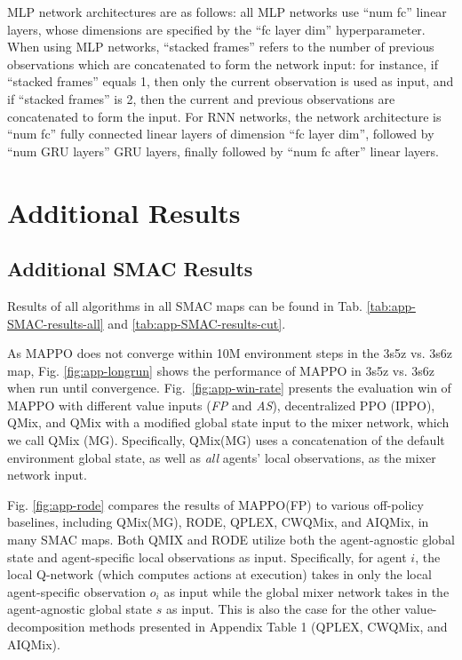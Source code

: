 MLP network architectures are as follows:
all MLP networks use ``num fc'' linear  layers, whose dimensions are specified by the ``fc layer dim'' hyperparameter. When using MLP networks, ``stacked frames'' refers to the number of previous observations which are concatenated to form the network input: for instance, if ``stacked frames'' equals 1, then only the current observation is used as input, and if ``stacked frames'' is 2, then the current and previous observations are concatenated to form the input. For RNN networks, the network architecture is ``num fc'' fully connected linear layers of dimension ``fc layer dim'', followed by ``num GRU layers'' GRU layers, finally followed by ``num fc after''  linear layers. 

\section{Additional Results}
\label{app:add-details}


\subsection{Additional SMAC Results}
\label{app:SMAC-allresults}

Results of all algorithms in all SMAC maps can be found in Tab. \ref{tab:app-SMAC-results-all} and \ref{tab:app-SMAC-results-cut}.

As MAPPO does not converge within 10M environment steps in the 3s5z vs. 3s6z map, Fig. \ref{fig:app-longrun} shows the performance of MAPPO in 3s5z vs. 3s6z when run until convergence. Fig.~\ref{fig:app-win-rate} presents the evaluation win of MAPPO with different value inputs (\emph{FP} and \emph{AS}), decentralized PPO (IPPO), QMix, and QMix with a modified global state input to the mixer network, which we call QMix (MG). Specifically, QMix(MG) uses a concatenation of the default environment global state, as well as \emph{all} agents' local observations, as the mixer network input. 


Fig. \ref{fig:app-rode} compares the results of MAPPO(FP) to various off-policy baselines, including QMix(MG), RODE, QPLEX, CWQMix, and AIQMix, in many SMAC maps. Both QMIX and RODE utilize both the agent-agnostic global state and agent-specific local observations as input. Specifically, for agent $i$, the local Q-network (which computes actions at execution) takes in only the local agent-specific observation $o_i$ as input while the global mixer network takes in the agent-agnostic global state $s$ as input.  This is also the case for the other value-decomposition methods presented in Appendix Table 1 (QPLEX, CWQMix, and AIQMix).

